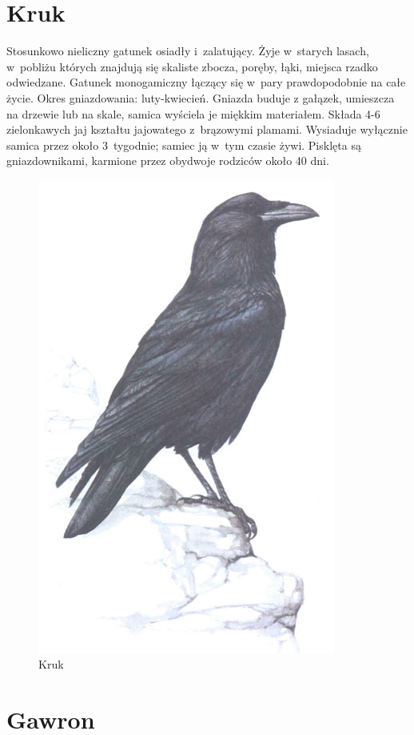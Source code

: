 \documentclass[a4paper,10pt]{report}
\begin{document}
\section{Kruk}
\label{sec:kruk}

Stosunkowo nieliczny gatunek osiadły i~zalatujący. Żyje w~starych lasach, w~pobliżu których znajdują się skaliste zbocza, poręby, łąki, miejsca rzadko odwiedzane. Gatunek monogamiczny łączący się w~pary prawdopodobnie na całe życie. Okres gniazdowania: luty-kwiecień. Gniazda buduje z gałązek, umieszcza na drzewie lub na skale, samica wyściela je miękkim materiałem. Składa 4-6 zielonkawych jaj kształtu jajowatego z~brązowymi plamami. Wysiaduje wyłącznie samica przez około 3~tygodnie; samiec ją w~tym czasie żywi. Pisklęta są gniazdownikami, karmione przez obydwoje rodziców około 40 dni. 

\begin{figure}
\centerline{\includegraphics[scale=0.4]{kruk}}
\caption{Kruk}
\end{figure}

\section{Gawron}
\label{sec:gawron}
\end{document}
